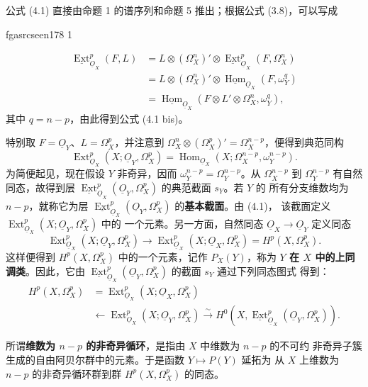 \documentclass[12pt,twoside,openany]{book}
\numberwithin{equation}{section}
\newcommand{\fgaunitid}{unbound}
\newcommand{\src}[1]{%
  \phantomsection
  \hypertarget{src:\fgaunitid:#1}{}%
  \hypertarget{fga.\fgaunitid.p#1}{}%
  \ifcsname fgasrcseen#1\endcsname\else
    \expandafter\gdef\csname fgasrcseen#1\endcsname{1}%
    \hypertarget{src:#1}{}%
  \fi
  \marginpar{\raggedleft\footnotesize\sffamily #1}%
}
\newcommand{\Osh}{\underline{O}}
\newcommand{\Homsh}{\underline{\operatorname{Hom}}}
\newcommand{\Extsh}{\underline{\operatorname{Ext}}}
\newcommand{\zhterm}[1]{\textbf{#1}}
\theoremstyle{plain}
\theoremstyle{definition}
\theoremstyle{remark}
\begin{document}
公式 (4.1) 直接由命题 1 的谱序列和命题 5 推出；根据公式 (3.8)，可以写成

\src{178}
\begin{align*}
\Extsh_{\Osh_X}^{p}(F,L)
&=L\otimes(\Omega_X^{n})'\otimes
  \Extsh_{\Osh_X}^{p}(F,\Omega_X^{n})\\
&=L\otimes(\Omega_X^{n})'\otimes
  \Homsh_{\Osh_X}(F,\omega_Y^{q})\\
&=\Homsh_{\Osh_X}\!\left(
  F\otimes L'\otimes\Omega_X^{n},\omega_Y^{q}\right),
\end{align*}
其中 $q=n-p$，由此得到公式 (4.1 bis)。

特别取 $F=\Osh_Y$、$L=\Omega_X^{p}$，并注意到
$\Omega_X^{n}\otimes(\Omega_X^{p})'=\Omega_X^{n-p}$，便得到典范同构
\begin{equation}\tag{4.2}
  \operatorname{Ext}_{\Osh_X}^{p}(X;\Osh_Y,\Omega_X^{p})
  =\operatorname{Hom}_{\Osh_X}
  (X;\Omega_X^{n-p},\omega_Y^{n-p}).
\end{equation}
为简便起见，现在假设 $Y$ 非奇异，因而
$\omega_Y^{n-p}=\Omega_Y^{n-p}$。从 $\Omega_X^{n-p}$ 到
$\Omega_Y^{n-p}$ 有自然同态，故得到层
$\Extsh_{\Osh_X}^{p}(\Osh_Y,\Omega_X^{p})$ 的典范截面 $s_Y$。若 $Y$ 的
所有分支维数均为 $n-p$，就称它为层
$\Extsh_{\Osh_X}^{p}(\Osh_Y,\Omega_X^{p})$ 的\zhterm{基本截面}。由 (4.1)，
该截面定义 $\operatorname{Ext}_{\Osh_X}^{p}(X;\Osh_Y,\Omega_X^{p})$ 中的
一个元素。另一方面，自然同态 $\Osh_X\longrightarrow\Osh_Y$ 定义同态
\[
  \operatorname{Ext}_{\Osh_X}^{p}(X;\Osh_Y,\Omega_X^{p})
  \longrightarrow
  \operatorname{Ext}_{\Osh_X}^{p}(X;\Osh_X,\Omega_X^{p})
  =H^{p}(X,\Omega_X^{p}).
\]
这样便得到 $H^{p}(X,\Omega_X^{p})$ 中的一个元素，记作 $P_X(Y)$，称为
\zhterm{$Y$ 在 $X$ 中的上同调类}。因此，它由
$\Extsh_{\Osh_X}^{p}(\Osh_Y,\Omega_X^{p})$ 的截面 $s_Y$ 通过下列同态图式
得到：
\begin{equation}\tag{4.3}
\begin{aligned}
H^{p}(X,\Omega_X^{p})
&=\operatorname{Ext}_{\Osh_X}^{p}(X;\Osh_X,\Omega_X^{p})\\
&\longleftarrow\operatorname{Ext}_{\Osh_X}^{p}(X;\Osh_Y,\Omega_X^{p})
\xrightarrow{\ \sim\ }
H^{0}\!\left(X,\Extsh_{\Osh_X}^{p}(\Osh_Y,\Omega_X^{p})\right).
\end{aligned}
\end{equation}

所谓\zhterm{维数为 $n-p$ 的非奇异循环}，是指由 $X$ 中维数为 $n-p$ 的不可约
非奇异子簇生成的自由阿贝尔群中的元素。于是函数 $Y\longmapsto P(Y)$ 延拓为
从 $X$ 上维数为 $n-p$ 的非奇异循环群到群 $H^{p}(X,\Omega_X^{p})$ 的同态。
\end{document}
